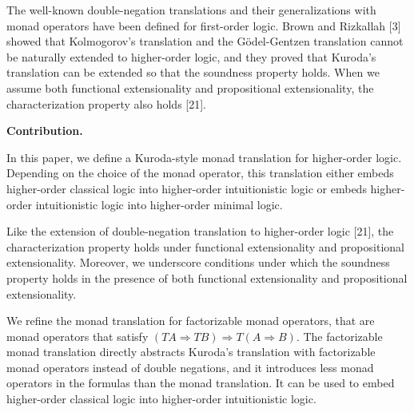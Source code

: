  
 
The well-known double-negation translations and their generalizations with monad operators have been defined for first-order logic. Brown and Rizkallah [3] showed that Kolmogorov’s translation and the Gödel-Gentzen translation cannot be naturally extended to higher-order logic, and they proved that Kuroda’s translation can be extended so that the soundness property holds. When we assume both functional extensionality and propositional extensionality, the characterization property also holds [21].\par
 
 
 
\par\medskip\noindent\textbf{Contribution.}\par
 
 
In this paper, we define a Kuroda-style monad translation for higher-order logic. Depending on the choice of the monad operator, this translation either embeds higher-order classical logic into higher-order intuitionistic logic or embeds higher-order intuitionistic logic into higher-order minimal logic.\par
 
 
 
Like the extension of double-negation translation to higher-order logic [21], the characterization property holds under functional extensionality and propositional extensionality. Moreover, we underscore conditions under which the soundness property holds in the presence of both functional extensionality and propositional extensionality.\par
 
 
 
We refine the monad translation for factorizable monad operators, that are monad operators that satisfy $(TA\mathbin{\Rightarrow}TB)\mathbin{\Rightarrow}T(A\mathbin{\Rightarrow}B)$. The factorizable monad translation directly abstracts Kuroda’s translation with factorizable monad operators instead of double negations, and it introduces less monad operators in the formulas than the monad translation. It can be used to embed higher-order classical logic into higher-order intuitionistic logic.\par
 
